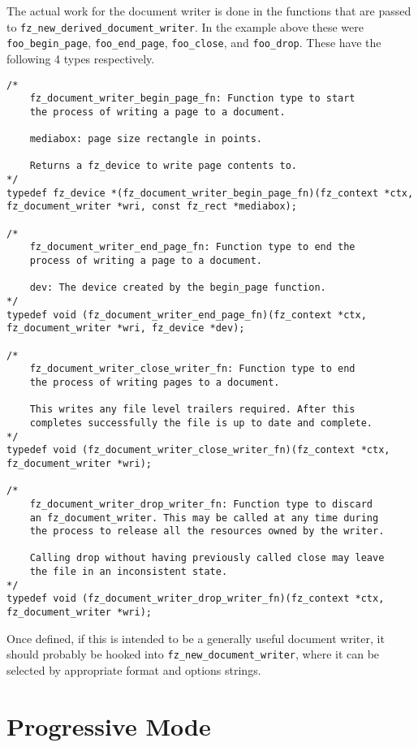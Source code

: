 \documentclass[oneside]{book}
\begin{document}
The actual work for the document writer is done in the functions that are passed to \texttt{fz\_new\_derived\_document\_writer}. In the example above these were \texttt{foo\_begin\_page}, \texttt{foo\_end\_page}, \texttt{foo\_close}, and \texttt{foo\_drop}. These have the following 4 types respectively.

\begin{lstlisting}
/*
	fz_document_writer_begin_page_fn: Function type to start
	the process of writing a page to a document.

	mediabox: page size rectangle in points.

	Returns a fz_device to write page contents to.
*/
typedef fz_device *(fz_document_writer_begin_page_fn)(fz_context *ctx, fz_document_writer *wri, const fz_rect *mediabox);

/*
	fz_document_writer_end_page_fn: Function type to end the
	process of writing a page to a document.

	dev: The device created by the begin_page function.
*/
typedef void (fz_document_writer_end_page_fn)(fz_context *ctx, fz_document_writer *wri, fz_device *dev);

/*
	fz_document_writer_close_writer_fn: Function type to end
	the process of writing pages to a document.

	This writes any file level trailers required. After this
	completes successfully the file is up to date and complete.
*/
typedef void (fz_document_writer_close_writer_fn)(fz_context *ctx, fz_document_writer *wri);

/*
	fz_document_writer_drop_writer_fn: Function type to discard
	an fz_document_writer. This may be called at any time during
	the process to release all the resources owned by the writer.

	Calling drop without having previously called close may leave
	the file in an inconsistent state.
*/
typedef void (fz_document_writer_drop_writer_fn)(fz_context *ctx, fz_document_writer *wri);
\end{lstlisting}

Once defined, if this is intended to be a generally useful document writer, it should probably be hooked into \texttt{fz\_new\_document\_writer}, where it can be selected by appropriate format and options strings.

\chapter{Progressive Mode}
\label{ProgressiveMode}
\end{document}
